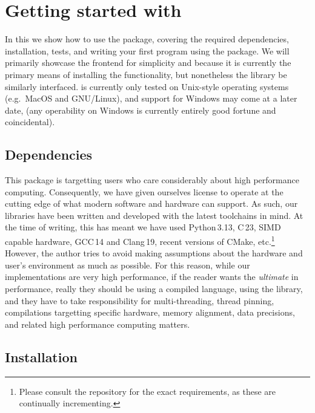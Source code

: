 \section{Getting started with \pyarv}
\label{sec:getting_started_with_pyarv}

In this  we show how to use the \pyarv package, covering the required dependencies, installation, tests, and writing your first program using the \pyarv package. We will primarily showcase the \pyarv frontend for simplicity and because it is currently the primary means of installing the functionality, but nonetheless the \arv library be similarly interfaced. \pyarv is currently only tested on Unix-style operating systems (e.g.\ MacOS and GNU/Linux), and support for Windows may come at a later date, (any operability on Windows is currently entirely good fortune and coincidental). 

\subsection{Dependencies}
\label{sec:dependencies}

This package is targetting users who care considerably about high performance computing. Consequently, we have given ourselves license to operate at the cutting edge of what modern software and hardware can support. As such, our libraries have been written and developed with the latest toolchains in mind. At the time of writing, this has meant we have used \mbox{Python\,3.13}, \mbox{C\,23}, SIMD capable hardware, \mbox{GCC\,14} and \mbox{Clang\,19}, recent versions of CMake, etc.\footnote{Please consult the repository for the exact requirements, as these are continually incrementing.} However, the author tries to avoid making assumptions about the hardware and user's environment as much as possible. For this reason, while our implementations are very high performance, if the reader wants the \emph{ultimate} in performance, really they should be using a compiled language, using the \arv library, and they have to take responsibility for multi-threading, thread pinning, compilations targetting specific hardware, memory alignment, data precisions, and related high performance computing matters. 

\subsection{Installation}
\label{sec:installation}

